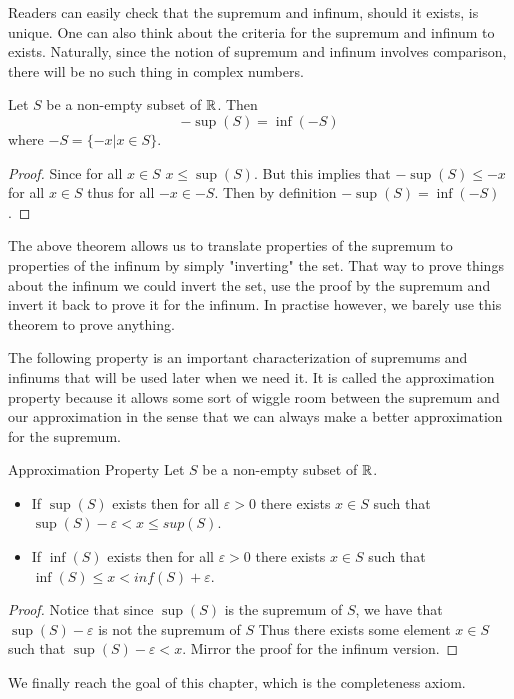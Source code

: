 \documentclass[a4paper]{article}
\begin{document}
Readers can easily check that the supremum and infinum, should it exists, is unique. One can also think about the criteria for the supremum and infinum to exists. Naturally, since the notion of supremum and infinum involves comparison, there will be no such thing in complex numbers. 

\begin{prp}{}{} Let $S$ be a non-empty subset of $\mathbb{R}$. Then $$-\sup(S)=\inf(-S)$$ where $-S=\{-x|x\in S\}$. \tcbline
\begin{proof} Since for all $x\in S$ $x\leq\sup(S)$. But this implies that $-\sup(S)\leq-x$ for all $x\in S$ thus for all $-x\in-S$. Then by definition $-\sup(S)=\inf(-S)$. 
\end{proof}
\end{prp}

The above theorem allows us to translate properties of the supremum to properties of the infinum by simply "inverting" the set. That way to prove things about the infinum we could invert the set, use the proof by the supremum and invert it back to prove it for the infinum. In practise however, we barely use this theorem to prove anything. 

The following property is an important characterization of supremums and infinums that will be used later when we need it. It is called the approximation property because it allows some sort of wiggle room between the supremum and our approximation in the sense that we can always make a better approximation for the supremum. 

\begin{prp}{Approximation Property}{} Let $S$ be a non-empty subset of $\mathbb{R}$. 
\begin{itemize}
\item If $\sup(S)$ exists then for all $\varepsilon>0$ there exists $x\in S$ such that $\sup(S)-\varepsilon<x\leq sup(S)$. 
\item If $\inf(S)$ exists then for all $\varepsilon>0$ there exists $x\in S$ such that $\inf(S)\leq x<inf(S)+\varepsilon$. 
\end{itemize}\tcbline
\begin{proof} Notice that since $\sup(S)$ is the supremum of $S$, we have that $\sup(S)-\varepsilon$ is not the supremum of $S$ Thus there exists some element $x\in S$ such that $\sup(S)-\varepsilon<x$. Mirror the proof for the infinum version. 
\end{proof}
\end{prp}

We finally reach the goal of this chapter, which is the completeness axiom. 
\end{document}
